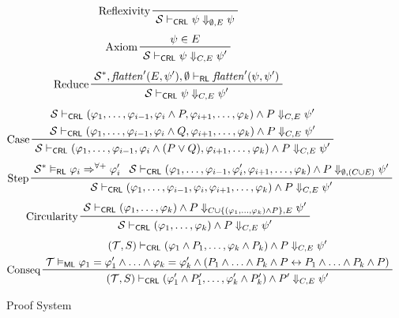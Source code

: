 \documentclass{article}
\newcommand{\RL}{\mathsf{RL}}
\newcommand{\ML}{\mathsf{ML}}
\newcommand{\CRL}{\mathsf{CRL}}
\begin{document}
\begin{figure}
    \centering
    \begin{align*}
    & \prftree[l]{Reflexivity}{\mathcal{S} \vdash_\CRL \psi \Downarrow_{\emptyset,E} \psi}
    \end{align*}
    \begin{align*}
    & \prftree[l]{Axiom}{\psi \in E}{\mathcal{S} \vdash_\CRL \psi \Downarrow_{C,E} \psi^\prime}
    \end{align*}
    \begin{align*}
    & \prftree[l]{Reduce}
      {\mathcal{S}^*, \mathit{flatten}^\prime(E, \psi^\prime), \emptyset \vdash_\RL
        \mathit{flatten}^\prime(\psi, \psi^\prime) }
      {\mathcal{S} \vdash_\CRL \psi \Downarrow_{C,E} \psi^\prime}
    \end{align*}
    \begin{align*}
    & \prftree[l]{Case}
    { \prfStackPremises
      {\mathcal{S} \vdash_\CRL (\varphi_1, \ldots, \varphi_{i-1}, \varphi_i \land P, \varphi_{i+1}, \ldots, \varphi_k) \land P \Downarrow_{C, E} \psi^\prime }
      {\mathcal{S} \vdash_\CRL (\varphi_1, \ldots, \varphi_{i-1}, \varphi_i \land Q, \varphi_{i+1}, \ldots, \varphi_k) \land P \Downarrow_{C, E} \psi^\prime }
    }
    {\mathcal{S} \vdash_\CRL (\varphi_1, \ldots, \varphi_{i-1}, \varphi_i \land (P \lor Q), \varphi_{i+1}, \ldots, \varphi_k) \land P \Downarrow_{C, E} \psi^\prime}
    \end{align*}
    \begin{align*}
    & \prftree[l]{Step}
    { \mathcal{S}^* \vDash_\RL \varphi_i \Rightarrow^{\forall+} \varphi_i^\prime}
    { \mathcal{S} \vdash_\CRL (\varphi_1, \ldots, \varphi_{i-1}, \varphi_i^\prime, \varphi_{i+1}, \ldots, \varphi_k)
      \land P
      \Downarrow_{\emptyset, (C \cup E)} \psi^\prime
    }
    {\mathcal{S} \vdash_\CRL (\varphi_1, \ldots, \varphi_{i-1}, \varphi_i, \varphi_{i+1}, \ldots, \varphi_k) \land P \Downarrow_{C, E} \psi^\prime}
    \end{align*}
    \begin{align*}
    & \prftree[l]{Circularity}
      { \mathcal{S} \vdash_\CRL (\varphi_1, \ldots, \varphi_k) \land P \Downarrow_{C \cup \{ (\varphi_1, \ldots, \varphi_k) \land P \} , E} \psi^\prime}
      { \mathcal{S} \vdash_\CRL (\varphi_1, \ldots, \varphi_k) \land P \Downarrow_{C, E} \psi^\prime}
    \end{align*}
    \begin{align*}
    & \prftree[l]{Conseq}
      { \prfStackPremises
        { (\mathcal{T}, S) \vdash_\CRL (\varphi_1 \land P_1, \ldots, \varphi_k \land P_k) \land P \Downarrow_{C, E} \psi^\prime}
        { \mathcal{T} \vDash_\ML \varphi_1 = \varphi_1^\prime \land \ldots \land \varphi_k = \varphi_k^\prime
        \land (P_1 \land \ldots \land P_k \land P \leftrightarrow P_1 \land \ldots \land P_k \land P) }
      }
      { (\mathcal{T}, S) \vdash_\CRL (\varphi_1^\prime \land P_1^\prime, \ldots, \varphi_k^\prime \land P_k^\prime) \land P^\prime \Downarrow_{C, E} \psi^\prime}
    \end{align*}
    \caption{Proof System}
    \label{fig:my_label}
\end{figure}
\end{document}
